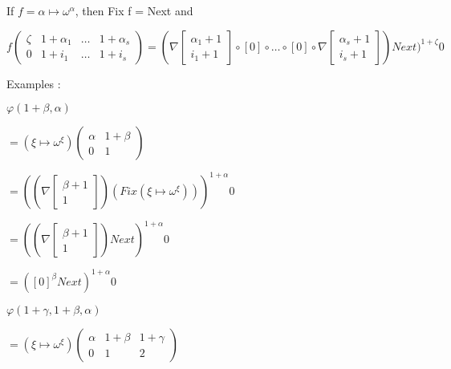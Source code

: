\documentclass[10pt]{article}
\begin{document}
\bigskip

If \( f = \alpha \mapsto \omega^\alpha \), then Fix f = Next and 

\( f \begin{pmatrix} \zeta & 1+\alpha_1 & \ldots & 1+\alpha_s \\
                     0     & 1+i_1      & \ldots & 1+i_s      \end{pmatrix} 
 = (\nabla \begin{bmatrix} \alpha_1+1 \\
                             i_1+1      \end{bmatrix} \circ [0] \circ \ldots \circ [0] \circ \nabla \begin{bmatrix} \alpha_s+1 \\
                                                                                                                    i_s+1      \end{bmatrix}) Next)^{1+\zeta} 0 \)

\bigskip

Examples :

\bigskip

\( \varphi(1+\beta,\alpha) \)

\( = (\xi \mapsto \omega^\xi) \begin{pmatrix} \alpha & 1+\beta \\
                                              0      & 1       \end{pmatrix} \)

\( = ((\nabla \begin{bmatrix} \beta+1 \\
                              1       \end{bmatrix}) (Fix (\xi \mapsto \omega^\xi)))^{1+\alpha} 0 \)

\( = ((\nabla \begin{bmatrix} \beta+1 \\
                              1       \end{bmatrix}) Next)^{1+\alpha} 0 \)

\( = ([0]^\beta Next)^{1+\alpha} 0 \)

\bigskip

\( \varphi(1+\gamma,1+\beta,\alpha) \)

\( = (\xi \mapsto \omega^\xi) \begin{pmatrix} \alpha & 1+\beta & 1+\gamma \\
                                              0      & 1       & 2        \end{pmatrix} \)
\end{document}
